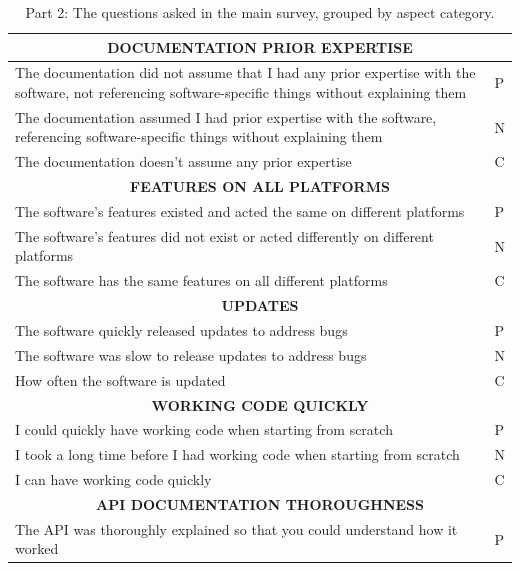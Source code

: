 \documentclass{cslthse-msc}
\begin{document}
    \begin{table}[H]
        \centering
        \caption{Part 2: The questions asked in the main survey, grouped by aspect category.}
        \label{tab:allQPart2}
        \begin{tabularx}{\columnwidth}{X|l} \hline \hline
        \multicolumn{2}{c}{\textbf{	DOCUMENTATION PRIOR EXPERTISE	}} \\ \hline
        The documentation did not assume that I had any prior expertise with the software, not referencing software-specific things without explaining them	&	P		\\ \hline
        The documentation assumed I had prior expertise with the software, referencing software-specific things without explaining them	&	N		\\ \hline
        The documentation doesn't assume any prior expertise	&	C \\ \hline \hline
        \multicolumn{2}{c}{\textbf{	FEATURES ON ALL PLATFORMS	}} \\ \hline
        The software's features existed and acted the same on different platforms	&	P		\\ \hline
        The software's features did not exist or acted differently on different platforms	&	N		\\ \hline
        The software has the same features on all different platforms	&	C		\\ \hline \hline
        \multicolumn{2}{c}{\textbf{	UPDATES	}} \\ \hline
        The software quickly released updates to address bugs	&	P		\\ \hline
        The software was slow to release updates to address bugs	&	N		\\ \hline
        How often the software is updated	&	C		\\ \hline \hline
        \multicolumn{2}{c}{\textbf{	WORKING CODE QUICKLY	}} \\ \hline
        I could quickly have working code when starting from scratch	&	P		\\ \hline
        I took a long time before I had working code when starting from scratch	&	N		\\ \hline
        I can have working code quickly	&	C		\\ \hline \hline
        \multicolumn{2}{c}{\textbf{	API DOCUMENTATION THOROUGHNESS	}} \\ \hline
        The API was thoroughly explained so that you could understand how it worked	&	P		\\ \hline

\end{tabularx}
\end{table}
\end{document}
